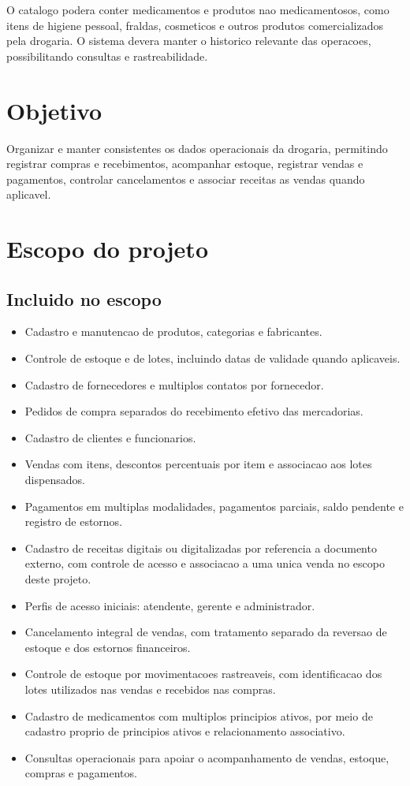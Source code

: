 \documentclass[12pt,a4paper]{article}
\begin{document}
O catalogo podera conter medicamentos e produtos nao medicamentosos, como itens de higiene pessoal, fraldas, cosmeticos e outros produtos comercializados pela drogaria. O sistema devera manter o historico relevante das operacoes, possibilitando consultas e rastreabilidade.

\section{Objetivo}
Organizar e manter consistentes os dados operacionais da drogaria, permitindo registrar compras e recebimentos, acompanhar estoque, registrar vendas e pagamentos, controlar cancelamentos e associar receitas as vendas quando aplicavel.

\section{Escopo do projeto}
\subsection{Incluido no escopo}
\begin{itemize}
\item Cadastro e manutencao de produtos, categorias e fabricantes.
\item Controle de estoque e de lotes, incluindo datas de validade quando aplicaveis.
\item Cadastro de fornecedores e multiplos contatos por fornecedor.
\item Pedidos de compra separados do recebimento efetivo das mercadorias.
\item Cadastro de clientes e funcionarios.
\item Vendas com itens, descontos percentuais por item e associacao aos lotes dispensados.
\item Pagamentos em multiplas modalidades, pagamentos parciais, saldo pendente e registro de estornos.
\item Cadastro de receitas digitais ou digitalizadas por referencia a documento externo, com controle de acesso e associacao a uma unica venda no escopo deste projeto.
\item Perfis de acesso iniciais: atendente, gerente e administrador.
\item Cancelamento integral de vendas, com tratamento separado da reversao de estoque e dos estornos financeiros.
\item Controle de estoque por movimentacoes rastreaveis, com identificacao dos lotes utilizados nas vendas e recebidos nas compras.
\item Cadastro de medicamentos com multiplos principios ativos, por meio de cadastro proprio de principios ativos e relacionamento associativo.
\item Consultas operacionais para apoiar o acompanhamento de vendas, estoque, compras e pagamentos.
\end{itemize}
\end{document}

